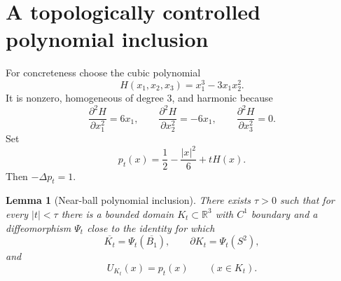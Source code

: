 \documentclass[11pt]{article}
\newtheorem{lemma}[theorem]{Lemma}
\theoremstyle{definition}
\theoremstyle{remark}
\newcommand{\R}{\mathbb{R}}
\newcommand{\lap}{\Delta}
\newcommand{\1}{\mathbf{1}}
\begin{document}
\section{A topologically controlled polynomial inclusion}

For concreteness choose the cubic polynomial
\begin{equation}\label{eq:H}
 H(x_1,x_2,x_3)=x_1^3-3x_1x_2^2.
\end{equation}
It is nonzero, homogeneous of degree $3$, and harmonic because
\[
 \frac{\partial^2 H}{\partial x_1^2}=6x_1,
 \qquad
 \frac{\partial^2 H}{\partial x_2^2}=-6x_1,
 \qquad
 \frac{\partial^2 H}{\partial x_3^2}=0.
\]
Set
\begin{equation}\label{eq:pt}
 p_t(x)=\frac12-\frac{|x|^2}{6}+tH(x).
\end{equation}
Then $-\lap p_t=1$.

\begin{lemma}[Near-ball polynomial inclusion]\label{lem:nearball}
There exists $\tau>0$ such that for every $|t|<\tau$ there is a bounded domain $K_t\subset\R^3$ with $C^1$ boundary and a diffeomorphism $\Psi_t$ close to the identity for which
\begin{equation}\label{eq:topology}
 \overline{K_t}=\Psi_t(\overline{B_1}),
 \qquad
 \partial K_t=\Psi_t(S^2),
\end{equation}
and
\begin{equation}\label{eq:potentialinside}
 U_{K_t}(x)=p_t(x)\qquad(x\in K_t).
\end{equation}
\end{lemma}
\end{document}
